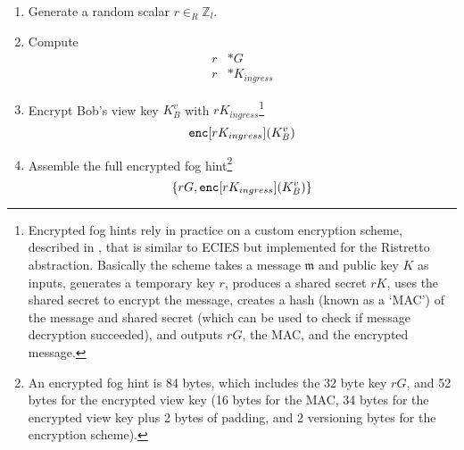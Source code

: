 \begin{enumerate}
    \item Generate a random scalar $r \in_R \mathbb{Z}_l$.
    \item Compute
    \begin{align*}
        r&*G \\
        r&*K_{ingress}
    \end{align*}
    \item Encrypt Bob's view key $K^v_B$ with $r K_{ingress}$\footnote{\label{footnote:fog-hint-encryption-scheme}Encrypted fog hints rely in practice on a custom encryption scheme, described in \cite{mobilecoin-custom-payload-encryption}, that is similar to ECIES \cite{practical-cryptography-ecies-scheme} but implemented for the Ristretto abstraction. Basically the scheme takes a message $\mathfrak{m}$ and public key $K$ as inputs, generates a temporary key $r$, produces a shared secret $r K$, uses the shared secret to encrypt the message, creates a hash (known as a `MAC') of the message and shared secret (which can be used to check if message decryption succeeded), and outputs $r G$, the MAC, and the encrypted message.}\vspace{.155cm}
    \[\textrm{\tt enc}[r K_{ingress}](K^v_B)\]
    \item Assemble the full encrypted fog hint\footnote{An encrypted fog hint is 84 bytes, which includes the 32 byte key $r G$, and 52 bytes for the encrypted view key (16 bytes for the MAC, 34 bytes for the encrypted view key plus 2 bytes of padding, and 2 versioning bytes for the encryption scheme).}\vspace{.155cm}
    \[\{r G, \textrm{\tt enc}[r K_{ingress}](K^v_B)\}\]
\end{enumerate}

